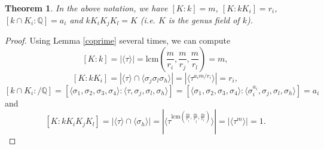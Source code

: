 \documentclass[12pt,a4paper]{article}
\newtheorem{theorem}{Theorem}
\newcommand{\Q}{\mathbb{Q}}
\newcommand{\lcm}{\mathrm{lcm}}
\begin{document}
\begin{theorem}
In the above notation, we have $[K:k]=m$, $[K:kK_i]=r_i$, $[k\cap K_i:\Q]=a_i$ and $kK_iK_jK_l=K$ (i.e. $K$ is the genus field of $k$).
\end{theorem}
\begin{proof}
Using Lemma \ref{coprime} several times, we can compute
$$[K:k]=|\langle\tau\rangle|=\lcm\left(\frac{m}{r_i},\frac{m}{r_j},\frac{m}{r_l}\right)=m,$$
$$[K:kK_i]=|\langle\tau\rangle\cap \langle\sigma_j\sigma_l\sigma_h\rangle|=|\langle\tau^{a_im/r_i}\rangle|=r_i,$$
$$[k\cap K_i:/\Q]=[\langle\sigma_1,\sigma_2,\sigma_3,\sigma_4\rangle:\langle\tau,\sigma_j,\sigma_l,\sigma_h\rangle]=[\langle\sigma_1,\sigma_2,\sigma_3,\sigma_4\rangle:\langle\sigma_i^{a_i},\sigma_j,\sigma_l,\sigma_h\rangle]=a_i$$
and
$$[K:kK_iK_jK_l]=|\langle\tau\rangle\cap \langle\sigma_h\rangle|=|\langle\tau^{\lcm\left(\frac{m}{r_i},\frac{m}{r_j},\frac{m}{r_l}\right)}\rangle|=|\langle\tau^m\rangle|=1.$$
\end{proof}
\end{document}
